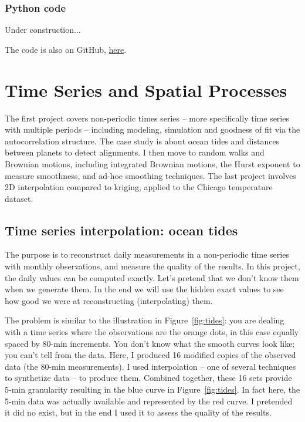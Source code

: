 \documentclass[oneside,10pt]{book}
\begin{document}
\subsection{Python code}\label{ferment}
 
 Under construction...

The code is also on GitHub, \href{https://github.com/VincentGranville/Main/blob/main/NoGAN_Hellinger2.py}{here}.
\vspace{1ex}



\chapter{Time Series and Spatial Processes}\label{tschj}

The first project covers non-periodic times series -- more specifically time series with multiple periods -- including modeling, simulation and 
 goodness of fit via the autocorrelation structure. The case study is about ocean tides and distances between planets to detect alignments. 
I then move to random walks and Brownian motions, including integrated Brownian motions, the Hurst exponent to measure smoothness, 
 and ad-hoc smoothing techniques. The last project involves 2D interpolation compared to kriging, applied to the Chicago temperature dataset. 



\section{Time series interpolation: ocean tides}\label{prgt43zas}

The purpose is to reconstruct  daily measurements in a non-periodic time series with monthly observations, and measure the quality of the
results. 
In this project, the daily values can be computed exactly. Let's pretend that we don't know them when we generate them.  In the end we will use the hidden exact values to see how good we were at reconstructing (interpolating) them.  

The problem is similar to the illustration
 in Figure~\ref{fig:tides}: you are dealing with a time series where the observations are the orange dots, in this case equally spaced by 80-min increments. You don't know what the smooth curves look like; you can't tell from the data. Here, I produced 16 modified copies of the observed data (the 80-min measurements). I used \textcolor{index}{interpolation} -- one of several techniques to synthetize data -- to produce them. Combined together, these 16 sets provide 5-min granularity resulting in the blue curve in Figure~\ref{fig:tides}. In fact here, the 5-min data was actually available and represented by the red curve. I pretended it did no exist, but in the end I used it to assess the quality of the results.
\end{document}
